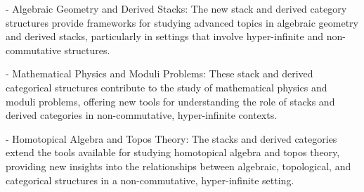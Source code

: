 \documentclass{article}
\begin{document}
- Algebraic Geometry and Derived Stacks: The new stack and derived category structures provide frameworks for studying advanced topics in algebraic geometry and derived stacks, particularly in settings that involve hyper-infinite and non-commutative structures.

- Mathematical Physics and Moduli Problems: These stack and derived categorical structures contribute to the study of mathematical physics and moduli problems, offering new tools for understanding the role of stacks and derived categories in non-commutative, hyper-infinite contexts.

- Homotopical Algebra and Topos Theory: The stacks and derived categories extend the tools available for studying homotopical algebra and topos theory, providing new insights into the relationships between algebraic, topological, and categorical structures in a non-commutative, hyper-infinite setting.
\end{document}
